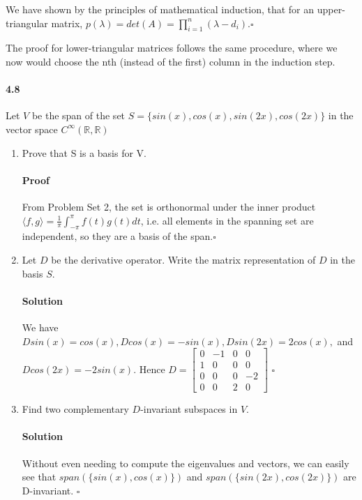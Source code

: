 \documentclass[letterpaper,12pt]{article}
\theoremstyle{definition}
\begin{document}
We have shown by the principles of mathematical induction, that for an upper-triangular matrix, $p(\lambda) = det(A) = \prod_{i = 1}^{n}(\lambda - d_i). \square$

The proof for lower-triangular matrices follows the same procedure, where we now would choose the nth (instead of the first) column in the induction step.



\paragraph{4.8} Let $V$ be the span of the set $S = \{sin(x), cos(x), sin(2x), cos(2x)\}$ in the vector space $C^\infty(\mathbb R, \mathbb R)$
\begin{enumerate}[label=(\roman*)]
\item Prove that S is a basis for V.

\paragraph{Proof} From Problem Set 2, the set is orthonormal under the inner product $\langle f , g  \rangle  = \frac{1}{\pi} \int_{- \pi}^{\pi} f(t) g(t) dt$, i.e. all elements in the spanning set are independent, so they are a basis of the span.$\square$

\item Let $D$ be the derivative operator. Write the matrix representation of $D$ in the basis $S$.

\paragraph{Solution} We have  $D sin(x) = cos(x), D cos(x) = -sin(x), D sin(2x) = 2cos(x),$ and $ D cos(2x) = -2sin(x)$.
Hence 
$D = \begin{bmatrix}
0 & -1 & 0 & 0 \\
1 & 0 & 0 & 0  \\
0 & 0 & 0 & -2 \\
0 & 0 & 2 & 0
\end{bmatrix}$ $\square$

\item Find two complementary $D$-invariant subspaces in $V$.

\paragraph{Solution} Without even needing to compute the eigenvalues and vectors, we can easily see that $span(\{sin(x), cos(x)\})$ and $span(\{sin(2x), cos(2x)\})$ are D-invariant. $\square$
\end{enumerate}
\end{document}
